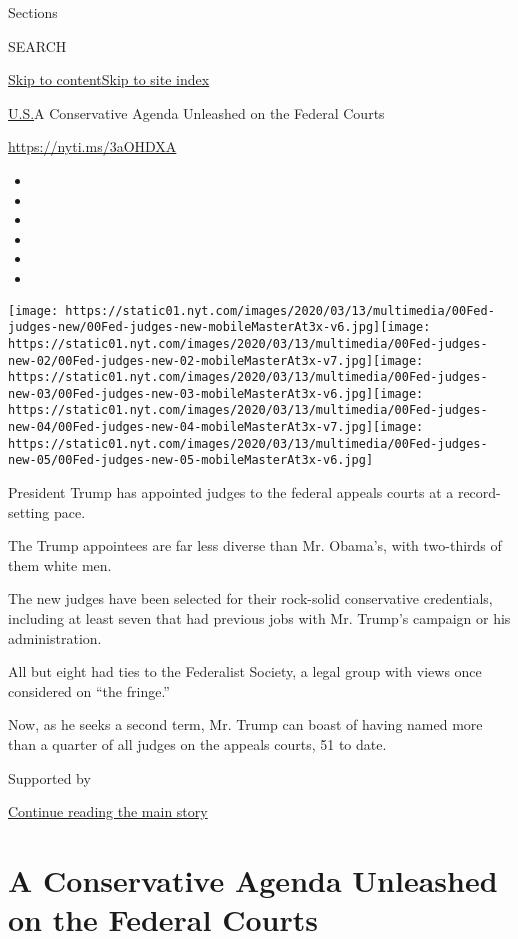 Sections

SEARCH

\protect\hyperlink{site-content}{Skip to
content}\protect\hyperlink{site-index}{Skip to site index}

\href{/section/us}{U.S.}\textbar{}A Conservative Agenda Unleashed on the
Federal Courts

\url{https://nyti.ms/3aOHDXA}

\begin{itemize}
\item
\item
\item
\item
\item
\item
\end{itemize}

\texttt{[image: https://static01.nyt.com/images/2020/03/13/multimedia/00Fed-judges-new/00Fed-judges-new-mobileMasterAt3x-v6.jpg]}\texttt{[image: https://static01.nyt.com/images/2020/03/13/multimedia/00Fed-judges-new-02/00Fed-judges-new-02-mobileMasterAt3x-v7.jpg]}\texttt{[image: https://static01.nyt.com/images/2020/03/13/multimedia/00Fed-judges-new-03/00Fed-judges-new-03-mobileMasterAt3x-v6.jpg]}\texttt{[image: https://static01.nyt.com/images/2020/03/13/multimedia/00Fed-judges-new-04/00Fed-judges-new-04-mobileMasterAt3x-v7.jpg]}\texttt{[image: https://static01.nyt.com/images/2020/03/13/multimedia/00Fed-judges-new-05/00Fed-judges-new-05-mobileMasterAt3x-v6.jpg]}

President Trump has appointed judges to the federal appeals courts at a
record-setting pace.

The Trump appointees are far less diverse than Mr. Obama's, with
two-thirds of them white men.

The new judges have been selected for their rock-solid conservative
credentials, including at least seven that had previous jobs with Mr.
Trump's campaign or his administration.

All but eight had ties to the Federalist Society, a legal group with
views once considered on ``the fringe.''

Now, as he seeks a second term, Mr. Trump can boast of having named more
than a quarter of all judges on the appeals courts, 51 to date.

Supported by

\protect\hyperlink{after-sponsor}{Continue reading the main story}

\hypertarget{a-conservative-agenda-unleashed-on-the-federal-courts}{%
\section{A Conservative Agenda Unleashed on the Federal
Courts}\label{a-conservative-agenda-unleashed-on-the-federal-courts}}


